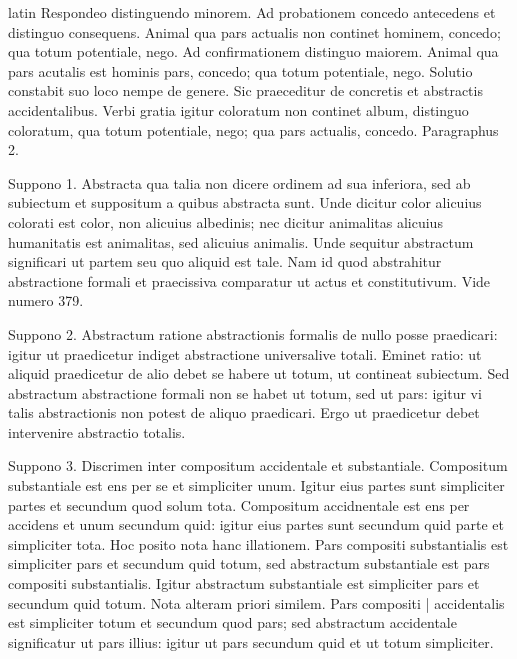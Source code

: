 \begin{otherlanguage*}{latin}
\pstart
  Respondeo distinguendo minorem. Ad probationem concedo antecedens et distinguo consequens. Animal qua pars actualis non continet hominem, concedo; qua totum potentiale, nego. Ad confirmationem distinguo maiorem. Animal qua pars acutalis est hominis pars, concedo; qua totum potentiale, nego. Solutio constabit suo loco nempe de genere. Sic praeceditur de concretis et abstractis accidentalibus. Verbi gratia igitur coloratum non continet album, distinguo coloratum, qua totum potentiale, nego; qua pars actualis, concedo. Paragraphus 2. 
\pend

        \pstart
        \pend
      
\pstart
  Suppono 1. Abstracta qua talia non dicere ordinem ad sua inferiora, sed ab subiectum et suppositum a quibus abstracta sunt. Unde dicitur color alicuius colorati est color, non alicuius albedinis; nec dicitur animalitas alicuius humanitatis est animalitas, sed alicuius animalis. Unde sequitur abstractum significari ut partem seu quo aliquid est tale. Nam id quod abstrahitur abstractione formali et praecissiva comparatur ut actus et constitutivum. Vide numero 379. 
\pend

\pstart
  Suppono 2. Abstractum ratione abstractionis formalis de nullo posse praedicari: igitur ut praedicetur indiget abstractione universalive totali. Eminet ratio: ut aliquid praedicetur de alio debet se habere ut totum, ut contineat subiectum. Sed abstractum abstractione formali non se habet ut totum, sed ut pars: igitur vi talis abstractionis non potest de aliquo praedicari. Ergo ut praedicetur debet intervenire abstractio totalis. 
\pend

\pstart
  Suppono 3. Discrimen inter compositum accidentale et substantiale. Compositum substantiale est ens per se et simpliciter unum. Igitur eius partes sunt simpliciter partes et secundum quod solum tota. Compositum accidnentale est ens per accidens et unum secundum quid: igitur eius partes sunt secundum quid parte et simpliciter tota. Hoc posito nota hanc illationem. Pars compositi substantialis est simpliciter pars et secundum quid totum, sed abstractum substantiale est pars compositi substantialis. Igitur abstractum substantiale est simpliciter pars et secundum quid totum. Nota alteram priori similem. Pars compositi \textnormal{|} accidentalis est simpliciter totum et secundum quod pars; sed abstractum accidentale significatur ut pars illius: igitur ut pars secundum quid et ut totum simpliciter. 
\pend


\end{otherlanguage*}

